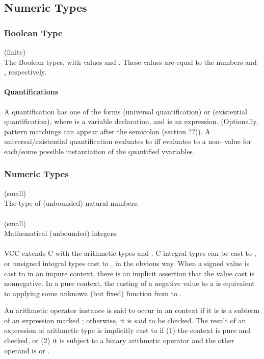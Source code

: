 \documentclass[preprint,nocopyrightspace]{sigplanconf}
\newcommand{\subsubsubsection}[1]{\paragraph{#1}}
\begin{document}
{{\subsection{Numeric Types}

\subsubsection{Boolean Type}

\vcc{\bool} (finite)\\
The Boolean types, with values \vcc{\true} and \vcc{\false}. These
values are equal to the \vcc{\natural} numbers  and , respectively.

\subsubsubsection{Quantifications}

A quantification has one of the forms
 (universal quantification) or 
 (existential quantification), 
where  is a variable declaration, and 
is an expression. (Optionally, pattern matchings can appear after the
semicolon (section ??)). A universal/existential quantification evaluates
to \vcc{\true} iff  evaluates to a non-\vcc{\false} value for
each/some possible instantiation of the quantified vvariables.

\subsubsection{Numeric Types}

\vcc{\natural} (small)\\
The type of (unbounded) natural numbers. 
\\\\
\vcc{\integer} (small)\\
Mathematical (unbounded) integers. 
\\\\
VCC extends C with the arithmetic types \vcc{\natural}
and \vcc{\integer}. C integral types can be cast to \vcc{\integer},
or unsigned integral types cast to \vcc{\natural}, in the obvious
way. When a signed value is cast to \vcc{\natural} in an impure
context, there is an implicit assertion that the value cast is
nonnegative. In a pure context, the casting of a negative value to 
a \vcc{\natural} is equivalent to applying some unknown (but fixed)
function from  to . 

An arithmetic operator instance is said to occur in
an \vcc{\unchecked} context if it is is a subterm of an expression
marked ; otherwise, it is said to be checked. The
result of an expression of arithmetic type is implicitly cast
to \vcc{\integer} if (1) the context is pure and checked, or (2) it is
subject to a binary arithmetic operator and the other operand
is \vcc{\natural} or \vcc{\integer}.

}}
\end{document}
